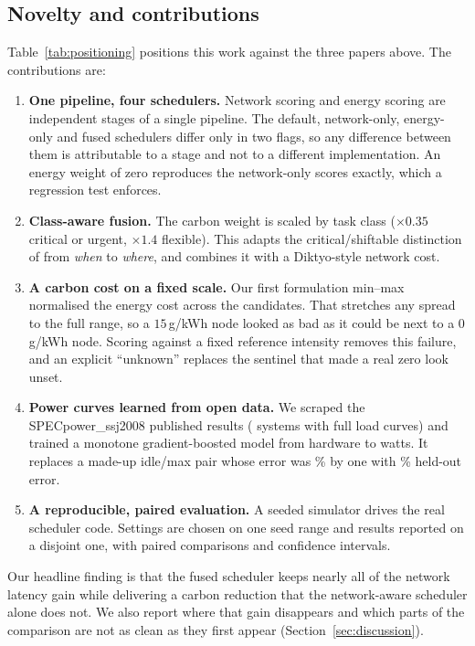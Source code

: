\documentclass[conference]{IEEEtran}
\begin{document}
\subsection{Novelty and contributions}
\label{sec:novelty}
Table~\ref{tab:positioning} positions this work against the three papers above. The contributions are:
\begin{enumerate}
\item \textbf{One pipeline, four schedulers.} Network scoring and energy scoring are independent stages of a single pipeline. The default, network-only, energy-only and fused schedulers differ only in two flags, so any difference between them is attributable to a stage and not to a different implementation. An energy weight of zero reproduces the network-only scores exactly, which a regression test enforces.
\item \textbf{Class-aware fusion.} The carbon weight is scaled by task class ($\times0.35$ critical or urgent, $\times1.4$ flexible). This adapts the critical/shiftable distinction of \cite{piontek2024} from \emph{when} to \emph{where}, and combines it with a Diktyo-style \cite{santos2023} network cost.
\item \textbf{A carbon cost on a fixed scale.} Our first formulation min--max normalised the energy cost across the candidates. That stretches any spread to the full range, so a $15$\,g/kWh node looked as bad as it could be next to a $0$\,g/kWh node. Scoring against a fixed reference intensity removes this failure, and an explicit ``unknown'' replaces the sentinel that made a real zero look unset.
\item \textbf{Power curves learned from open data.} We scraped the SPECpower\_ssj2008 published results (\NSystemsScraped{} systems with full load curves) and trained a monotone gradient-boosted model from hardware to watts. It replaces a made-up idle/max pair whose error was \MapePlaceholder\% by one with \MapeXgb\% held-out error.
\item \textbf{A reproducible, paired evaluation.} A seeded simulator drives the real scheduler code. Settings are chosen on one seed range and results reported on a disjoint one, with paired comparisons and confidence intervals.
\end{enumerate}
Our headline finding is that the fused scheduler keeps nearly all of the network latency gain while delivering a carbon reduction that the network-aware scheduler alone does not. We also report where that gain disappears and which parts of the comparison are not as clean as they first appear (Section~\ref{sec:discussion}).
\end{document}

